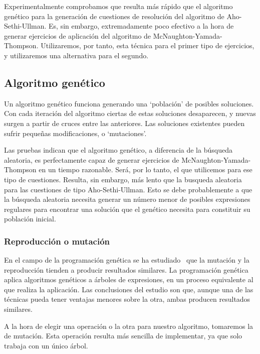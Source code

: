 Experimentalmente comprobamos que resulta más rápido que el algoritmo genético para la generación de cuestiones de resolución del algoritmo de Aho-Sethi-Ullman.
Es, sin embargo, extremadamente poco efectivo a la hora de generar ejercicios de aplicación del algoritmo de McNaughton-Yamada-Thompson.
Utilizaremos, por tanto, esta técnica para el primer tipo de ejercicios, y utilizaremos una alternativa para el segundo.

\subsection{Algoritmo genético}
Un algoritmo genético funciona generando una `población' de posibles soluciones.
Con cada iteración del algoritmo ciertas de estas soluciones desaparecen, y nuevas surgen a partir de cruces entre las anteriores.
Las soluciones existentes pueden sufrir pequeñas modificaciones, o `mutaciones'.

Las pruebas indican que el algoritmo genético, a diferencia de la búsqueda aleatoria, es perfectamente capaz de generar ejercicios de McNaughton-Yamada-Thompson en un tiempo razonable.
Será, por lo tanto, el que utilicemos para ese tipo de cuestiones.
Resulta, sin embargo, más lento que la busqueda aleatoria para las cuestiones de tipo Aho-Sethi-Ullman.
Esto se debe probablemente a que la búsqueda aleatoria necesita generar un número menor de posibles expresiones regulares para encontrar una solución que el genético necesita para constituir su población inicial.

\subsubsection{Reproducción o mutación}
En el campo de la programación genética se ha estudiado~\cite{Luke98arevised} que la mutación y la reproducción tienden a producir resultados similares.
La programación genética aplica algoritmos genéticos a árboles de expresiones, en un proceso equivalente al que realiza la aplicación.
Las conclusiones del estudio son que, aunque una de las técnicas pueda tener ventajas menores sobre la otra, ambas producen resultados similares.

A la hora de elegir una operación o la otra para nuestro algoritmo, tomaremos la de mutación.
Esta operación resulta más sencilla de implementar, ya que solo trabaja con un único árbol.